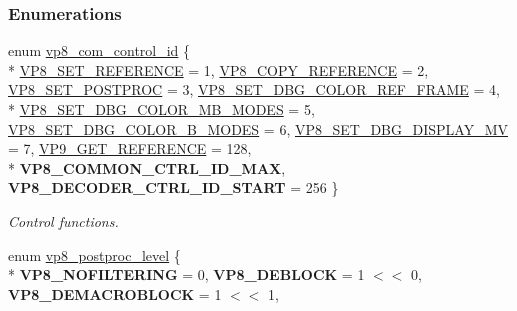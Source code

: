 \subsubsection*{Enumerations}
\begin{DoxyCompactItemize}
\item 
enum \hyperlink{group__vp8_ga8cadbc8e0af3da96ef7a2dbd4ed06599}{vp8\+\_\+com\+\_\+control\+\_\+id} \{ \\*
\hyperlink{group__vp8_gga8cadbc8e0af3da96ef7a2dbd4ed06599a7abc38d739a5ef49c36d9b2cd88e64a6}{V\+P8\+\_\+\+S\+E\+T\+\_\+\+R\+E\+F\+E\+R\+E\+N\+CE} = 1, 
\hyperlink{group__vp8_gga8cadbc8e0af3da96ef7a2dbd4ed06599a5375b3ea3a4867d50daee6f5971c7470}{V\+P8\+\_\+\+C\+O\+P\+Y\+\_\+\+R\+E\+F\+E\+R\+E\+N\+CE} = 2, 
\hyperlink{group__vp8_gga8cadbc8e0af3da96ef7a2dbd4ed06599a43e85c68bc1c1473f4a94b005a59482c}{V\+P8\+\_\+\+S\+E\+T\+\_\+\+P\+O\+S\+T\+P\+R\+OC} = 3, 
\hyperlink{group__vp8_gga8cadbc8e0af3da96ef7a2dbd4ed06599ab52ea7a97668b603812dfc205b0fd783}{V\+P8\+\_\+\+S\+E\+T\+\_\+\+D\+B\+G\+\_\+\+C\+O\+L\+O\+R\+\_\+\+R\+E\+F\+\_\+\+F\+R\+A\+ME} = 4, 
\\*
\hyperlink{group__vp8_gga8cadbc8e0af3da96ef7a2dbd4ed06599aa0d5c3eaa7cbecaf64403edc8450b060}{V\+P8\+\_\+\+S\+E\+T\+\_\+\+D\+B\+G\+\_\+\+C\+O\+L\+O\+R\+\_\+\+M\+B\+\_\+\+M\+O\+D\+ES} = 5, 
\hyperlink{group__vp8_gga8cadbc8e0af3da96ef7a2dbd4ed06599ae0052b9dd3c64a4bb822abafb4755a87}{V\+P8\+\_\+\+S\+E\+T\+\_\+\+D\+B\+G\+\_\+\+C\+O\+L\+O\+R\+\_\+\+B\+\_\+\+M\+O\+D\+ES} = 6, 
\hyperlink{group__vp8_gga8cadbc8e0af3da96ef7a2dbd4ed06599abc6aef0d7e0486d25348de217ad8441d}{V\+P8\+\_\+\+S\+E\+T\+\_\+\+D\+B\+G\+\_\+\+D\+I\+S\+P\+L\+A\+Y\+\_\+\+MV} = 7, 
\hyperlink{group__vp8_gga8cadbc8e0af3da96ef7a2dbd4ed06599a91e44472b21c720a9a7d087c7226d083}{V\+P9\+\_\+\+G\+E\+T\+\_\+\+R\+E\+F\+E\+R\+E\+N\+CE} = 128, 
\\*
{\bfseries V\+P8\+\_\+\+C\+O\+M\+M\+O\+N\+\_\+\+C\+T\+R\+L\+\_\+\+I\+D\+\_\+\+M\+AX}, 
{\bfseries V\+P8\+\_\+\+D\+E\+C\+O\+D\+E\+R\+\_\+\+C\+T\+R\+L\+\_\+\+I\+D\+\_\+\+S\+T\+A\+RT} = 256
 \}\begin{DoxyCompactList}\small\item\em Control functions. \end{DoxyCompactList}
\item 
enum \hyperlink{group__vp8_ga99557e20eb37826e6792cd8819121770}{vp8\+\_\+postproc\+\_\+level} \{ \\*
{\bfseries V\+P8\+\_\+\+N\+O\+F\+I\+L\+T\+E\+R\+I\+NG} = 0, 
{\bfseries V\+P8\+\_\+\+D\+E\+B\+L\+O\+CK} = 1 $<$$<$ 0, 
{\bfseries V\+P8\+\_\+\+D\+E\+M\+A\+C\+R\+O\+B\+L\+O\+CK} = 1 $<$$<$ 1, 

\end{DoxyCompactItemize}
